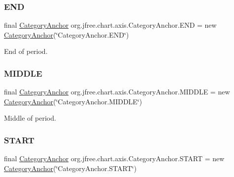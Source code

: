 \subsubsection{\texorpdfstring{E\+ND}{END}}
{\footnotesize\ttfamily final \mbox{\hyperlink{classorg_1_1jfree_1_1chart_1_1axis_1_1_category_anchor}{Category\+Anchor}} org.\+jfree.\+chart.\+axis.\+Category\+Anchor.\+E\+ND = new \mbox{\hyperlink{classorg_1_1jfree_1_1chart_1_1axis_1_1_category_anchor}{Category\+Anchor}}(\char`\"{}Category\+Anchor.\+E\+ND\char`\"{})\hspace{0.3cm}{\ttfamily [static]}}

End of period. \mbox{\label{classorg_1_1jfree_1_1chart_1_1axis_1_1_category_anchor_af23cb27a981eec0513b4bb16645818cf}} 
\subsubsection{\texorpdfstring{M\+I\+D\+D\+LE}{MIDDLE}}
{\footnotesize\ttfamily final \mbox{\hyperlink{classorg_1_1jfree_1_1chart_1_1axis_1_1_category_anchor}{Category\+Anchor}} org.\+jfree.\+chart.\+axis.\+Category\+Anchor.\+M\+I\+D\+D\+LE = new \mbox{\hyperlink{classorg_1_1jfree_1_1chart_1_1axis_1_1_category_anchor}{Category\+Anchor}}(\char`\"{}Category\+Anchor.\+M\+I\+D\+D\+LE\char`\"{})\hspace{0.3cm}{\ttfamily [static]}}

Middle of period. \mbox{\label{classorg_1_1jfree_1_1chart_1_1axis_1_1_category_anchor_ae465435cffa5a3e0f3991eb50a57b8f5}} 
\subsubsection{\texorpdfstring{S\+T\+A\+RT}{START}}
{\footnotesize\ttfamily final \mbox{\hyperlink{classorg_1_1jfree_1_1chart_1_1axis_1_1_category_anchor}{Category\+Anchor}} org.\+jfree.\+chart.\+axis.\+Category\+Anchor.\+S\+T\+A\+RT = new \mbox{\hyperlink{classorg_1_1jfree_1_1chart_1_1axis_1_1_category_anchor}{Category\+Anchor}}(\char`\"{}Category\+Anchor.\+S\+T\+A\+RT\char`\"{})\hspace{0.3cm}{\ttfamily [static]}}

